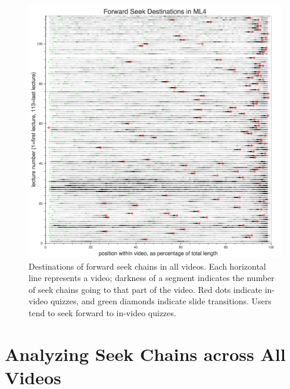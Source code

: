 \documentclass{sigchi}
\begin{document}
\begin{figure}
\includegraphics[width=1.0\columnwidth]{forward-seek-destinations-allvideos}
\caption{Destinations of forward seek chains in all videos. Each horizontal line represents a video; darkness of a segment indicates the number of seek chains going to that part of the video. Red dots indicate in-video quizzes, and green diamonds indicate slide transitions. Users tend to seek forward to in-video quizzes.}
\label{fig:forward-seek-destinations-allvideos}
\end{figure}




\section{Analyzing Seek Chains across All Videos}
\end{document}
